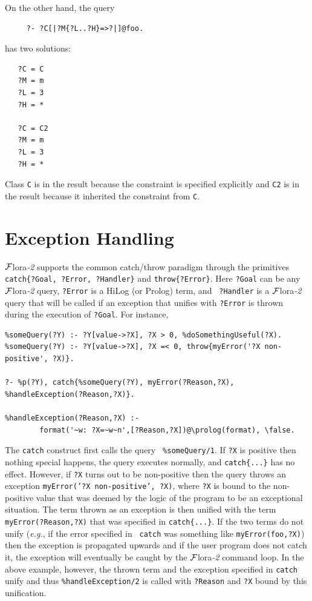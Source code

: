\documentclass[11pt]{article}
\newcommand{\FLSYSTEM}{{\mbox{\sc ${\cal F}${lora}\rm\emph{-2}}}\xspace}
\begin{document}
On the other hand, the query
\begin{verbatim}
     ?- ?C[|?M{?L..?H}=>?|]@foo.
\end{verbatim}
has two solutions:
\begin{verbatim}
   ?C = C 
   ?M = m
   ?L = 3
   ?H = *
   
   ?C = C2
   ?M = m
   ?L = 3
   ?H = *
\end{verbatim}
Class {\tt C} is in the result because the constraint is specified
explicitly and {\tt C2} is in the result because it inherited the
constraint from {\tt C}.   


\section{Exception Handling}\label{sec-errors}

\FLSYSTEM supports the common catch/throw paradigm through the primitives {\tt
  catch\{?Goal, ?Error, ?Handler\}} and {\tt throw\{?Error\}}.  Here {\tt ?Goal}
can be any \FLSYSTEM query, {\tt ?Error} is a HiLog (or Prolog) term, and {\tt
  ?Handler} is a \FLSYSTEM query that will be called if an exception that
unifies with {\tt ?Error} is thrown during the execution of {\tt ?Goal}. For
instance,

\begin{verbatim}
%someQuery(?Y) :- ?Y[value->?X], ?X > 0, %doSomethingUseful(?X).  
%someQuery(?Y) :- ?Y[value->?X], ?X =< 0, throw{myError('?X non-positive', ?X)}.

?- %p(?Y), catch{%someQuery(?Y), myError(?Reason,?X), %handleException(?Reason,?X)}.

%handleException(?Reason,?X) :-
        format('~w: ?X=~w~n',[?Reason,?X])@\prolog(format), \false.
\end{verbatim}
The {\tt catch} construct first calls the query {\tt
  \verb|%|someQuery/1}. If {\tt ?X} is positive then nothing special
  happens, the query executes normally, and {\tt catch\{...\}} has no
  effect.  However, if {\tt ?X} turns out to be non-positive then the
  query throws an exception {\tt myError('?X {\tt non-positive', ?X)}},
  where {\tt ?X} is bound to the non-positive value that was deemed by
  the logic of the program to be an exceptional situation.  The term
  thrown as an exception is then unified with the term {\tt
  myError(?Reason,?X)} that was specified in {\tt catch\{...\}}. If the
  two terms do not unify ({\it e.g.}, if the error specified in {\tt
  catch} was something like {\tt myError(foo,?X)}) then the exception is
  propagated upwards and if the user program does not catch it, the
  exception will eventually be caught by the \FLSYSTEM command loop. In the
  above example,
  however, the thrown term and the exception specified in
  {\tt catch} unify and thus {\tt \verb|%|handleException/2} is called
  with {\tt ?Reason} and {\tt ?X} bound by this unification.
\end{document}
